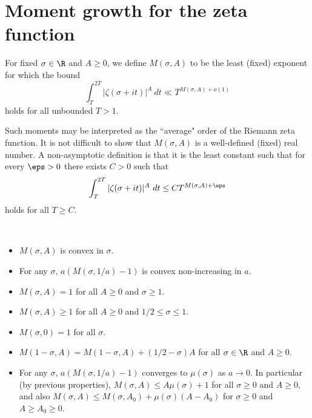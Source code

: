 \chapter{Moment growth for the zeta function}\label{zeta-moment-chapter}

\begin{definition}\label{zeta-moment-def}  For fixed $\sigma \in \R$ and $A \geq 0$, we define $M(\sigma,A)$ to be the least (fixed) exponent for which the bound
$$ \int_T^{2T} |\zeta(\sigma+it)|^A\ dt \ll T^{M(\sigma,A)+o(1)}$$
holds for all unbounded $T > 1$.
\end{definition}

Such moments may be interpreted as the ``average" order of the Riemann zeta function. It is not difficult to show that $M(\sigma,A)$ is a well-defined (fixed) real number.  A non-asymptotic definition is that it is the least constant such that for every $\eps>0$ there exists $C>0$ such that
$$ \int_T^{2T} |\zeta(\sigma+it)|^A\ dt \leq C T^{M(\sigma,A)+\eps}$$
holds for all $T \geq C$.

\begin{lemma}\label{zeta-moment-basic}\
\begin{itemize}
\item[(i)] $M(\sigma,A)$ is convex in $\sigma$.
\item[(ii)] For any $\sigma$, $a (M(\sigma,1/a)-1)$ is convex non-increasing in $a$.
\item[(iii)] $M(\sigma,A)=1$ for all $A \geq 0$ and $\sigma \geq 1$.
\item[(iv)] $M(\sigma,A) \geq 1$ for all $A \geq 0$ and $1/2 \leq \sigma \leq 1$.
\item[(v)] $M(\sigma,0) = 1$ for all $\sigma$.
\item[(vi)] $M(1-\sigma,A) = M(1-\sigma,A) + (1/2-\sigma) A$ for all $\sigma \in \R$ and $A \geq 0$.
\item[(vii)] For any $\sigma$, $a(M(\sigma,1/a)-1)$ converges to $\mu(\sigma)$ as $a \to 0$.  In particular (by previous properties), $M(\sigma,A) \leq A \mu(\sigma) + 1$ for all $\sigma \geq 0$ and $A \geq 0$, and also $M(\sigma,A) \leq M(\sigma,A_0) + \mu(\sigma)(A-A_0)$ for $\sigma \geq 0$ and $A \geq A_0 \geq 0$.
\end{itemize}
\end{lemma}

